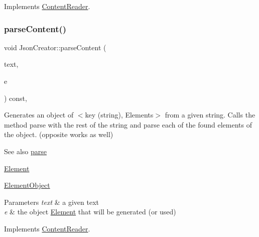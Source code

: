 Implements \mbox{\hyperlink{classContentReader_a91fdd738983dcc7a246c3c163007dfa9}{Content\+Reader}}.

\mbox{\label{classJsonCreator_a9f57af1a7925074b8e3e4175f74c886a}} 
\subsubsection{\texorpdfstring{parse\+Content()}{parseContent()}\hspace{0.1cm}{\footnotesize\ttfamily [5/6]}}
{\footnotesize\ttfamily void Json\+Creator\+::parse\+Content (\begin{DoxyParamCaption}\item[{std\+::string \&}]{text,  }\item[{\mbox{\hyperlink{classElementObject}{Element\+Object}} $\ast$}]{e }\end{DoxyParamCaption}) const\hspace{0.3cm}{\ttfamily [override]}, {\ttfamily [virtual]}}

Generates an object of $<$key (string), Elements$>$ from a given string. Calls the method parse with the rest of the string and parse each of the found elements of the object. (opposite works as well) \begin{DoxySeeAlso}{See also}
\mbox{\hyperlink{classJsonCreator_a505ff309c6b144d29478804b0e187c6f}{parse}} 

\mbox{\hyperlink{classElement}{Element}} 

\mbox{\hyperlink{classElementObject}{Element\+Object}}
\end{DoxySeeAlso}

\begin{DoxyParams}{Parameters}
{\em text} & a given text \\
\hline
{\em e} & the object \mbox{\hyperlink{classElement}{Element}} that will be generated (or used) \\
\hline
\end{DoxyParams}


Implements \mbox{\hyperlink{classContentReader_a59a8de2bf3436e46b4d029a9b3c3c9da}{Content\+Reader}}.

\mbox{\label{classJsonCreator_a5e841806165fd5cb595d9f7d7c924080}} 
